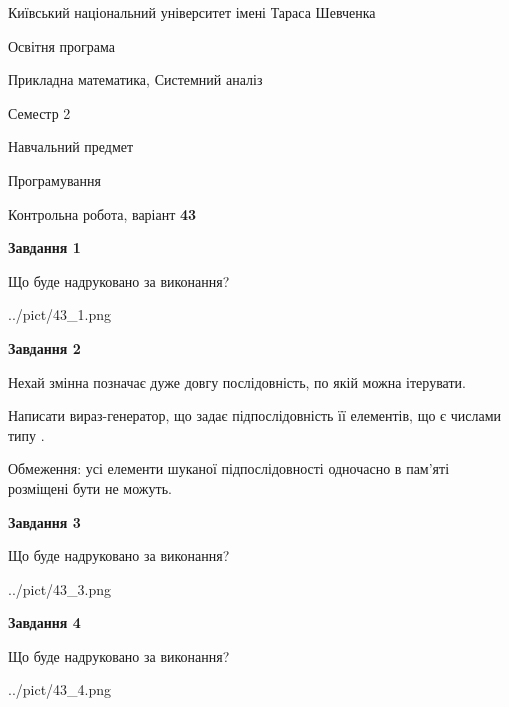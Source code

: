 \documentclass[12pt, ukrainian]{article}
\begin{document}
{{\begin {small}\par
{ \center  Київський національний університет імені Тараса Шевченка \par}
{\parbox {5 cm}{Освітня програма \hfill}{\parbox {8 cm}{Прикладна математика, Системний аналіз \hfill}}\parbox {5 cm}{\hfill Семестр 2}}\par
{\parbox {5 cm} {Навчальний предмет \hfill}\parbox {7 cm}{Програмування \hfill}\parbox {6cm}{\hfill}\par}\vspace{-7pt} \end{small}}{\center Контрольна робота, варіант  \No \textbf
{ 43 }\par}}
{
\begin {large}
{\begin {center}\textbf{Завдання 1}\end {center}}\par
Що буде надруковано за виконання?\par\par
\begin{center}
	{../pict/43_1.png}
\end{center}
\newpage

{\begin {center}\textbf{Завдання 2}\end {center}}\par
Нехай змінна  позначає дуже довгу послідовність, по якій можна ітерувати.

Написати вираз-генератор, що задає підпослідовність її елементів, що є числами типу .

Обмеження: усі елементи шуканої підпослідовності одночасно в пам'яті розміщені бути не можуть.\par
\newpage

{\begin {center}\textbf{Завдання 3}\end {center}}\par
Що буде надруковано за виконання?\par
\begin{center}
	{../pict/43_3.png}
\end{center}
\newpage

{\begin {center}\textbf{Завдання 4}\end {center}}\par
Що буде надруковано за виконання?\par
\begin{center}
	{../pict/43_4.png}
\end{center}
\newpage


\end{large}}
\end{document}

